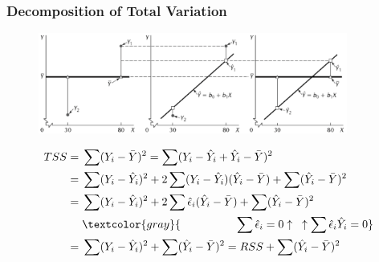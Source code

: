 \documentclass[xcolor={dvipsnames}]{beamer}
\begin{document}
\frame
{
 \frametitle{Decomposition of Total Variation}

\begin{figure}
\centering
\includegraphics[width=4in]{stuff/sspartition.png} 
\end{figure}
\vspace{-2em}

\begin{align*}
TSS = {} & \sum(Y_i - \bar Y)^2 =  \sum( Y_i - \hat Y_i + \hat Y_i - \bar Y )^2 \\
= {} & \sum( Y_i - \hat Y_i )^2 + 2 \sum ( Y_i - \hat Y_i )( \hat Y_i - \bar Y ) +\sum( \hat Y_i - \bar Y )^2 \\
= {} & \sum( Y_i - \hat Y_i )^2 + 2 \sum \hat \epsilon_i ( \hat Y_i - \bar Y ) + \sum( \hat Y_i - \bar Y )^2 \\
{} &\textcolor{gray}{\quad\quad\quad\quad\quad\sum \hat \epsilon_i = 0 \uparrow \;\;\; \uparrow \sum \hat \epsilon_i\hat Y_i = 0}\\
= {} & \sum( Y_i - \hat Y_i )^2 + \sum( \hat Y_i - \bar Y )^2 =  RSS + \sum( \hat Y_i - \bar Y )^2 
\end{align*}

}
\end{document}
